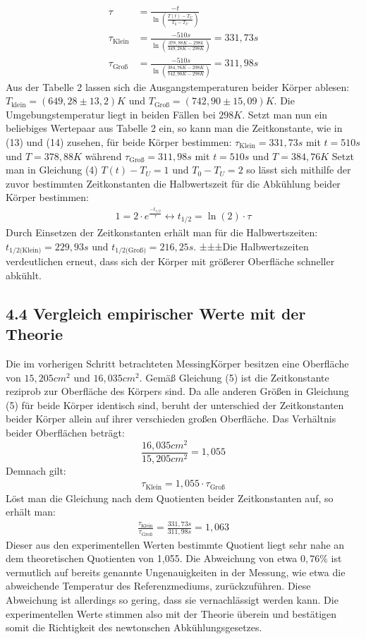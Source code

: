 \documentclass[a4paper]{article}
\begin{document}
\begin{align}
\tau&=\frac{-t}{\ln\left(\frac{T(t)-T_U}{T_0-T_U}\right)}\\
\tau_{\text{Klein}}&=\frac{-510s}{\ln\left(\frac{378,88K-298k}{349,28K-298K}\right)}=331,73s\\
\tau_{\text{Groß}}&=\frac{-510s}{\ln\left(\frac{384,76K-298K}{742,90K-298K}\right)}=311,98s
\end{align}
 Aus der Tabelle 2 lassen sich die Ausgangstemperaturen beider Körper ablesen: $T_{\text{klein}}=(649,28\pm 13,2)K$ und $T_{\text{Groß}}=(742,90\pm 15,09)K$. Die Umgebungstemperatur liegt in beiden Fällen bei $298K$. Setzt man nun ein beliebiges Wertepaar aus Tabelle 2 ein, so kann man die Zeitkonstante, wie in (13) und (14) zusehen, für beide Körper bestimmen: $\tau_{\text{Klein}}=331,73s$ mit $t=510s$ und $T=378,88K$ während $\tau_{\text{Groß}}=311,98s$ mit $t=510s$ und $T=384,76K$ Setzt man in Gleichung (4) $T(t)-T_U=1$ und $T_0-T_U=2$ so lässt sich mithilfe der zuvor bestimmten Zeitkonstanten die Halbwertszeit für die Abkühlung beider Körper bestimmen:
\begin{align}
1=2\cdot e^{\frac{-t_{1/2}}{\tau}}\leftrightarrow t_{1/2}=\ln(2)\cdot\tau
\end{align}
Durch Einsetzen der Zeitkonstanten erhält man für die Halbwertszeiten: $t_{1/2\text{(Klein)}}=229,93s$ und $t_{1/2\text{(Groß)}}=216,25s$. ±±±Die Halbwertszeiten verdeutlichen erneut, dass sich der Körper mit größerer Oberfläche schneller abkühlt.
\subsection*{4.4 Vergleich empirischer Werte mit der Theorie}
Die im vorherigen Schritt betrachteten MessingKörper  besitzen eine Oberfläche von $15,205cm^2$ und $16,035cm^2$. Gemäß Gleichung (5) ist die Zeitkonstante reziprob zur Oberfläche des Körpers sind. Da alle anderen Größen in Gleichung (5) für beide Körper identisch sind, beruht der unterschied der Zeitkonstanten beider Körper allein auf ihrer verschieden großen Oberfläche. Das Verhältnis beider Oberflächen beträgt: $$\frac{16,035cm^2}{15,205cm^2}=1,055$$ Demnach gilt:
\begin{align}
\tau_{\text{Klein}}=1,055\cdot\tau_{\text{Groß}}
\end{align}
Löst man die Gleichung nach dem Quotienten beider Zeitkonstanten auf, so erhält man:
\begin{align}
\frac{\tau_{\text{Klein}}}{\tau_{\text{Groß}}}=\frac{331,73s}{311,98s}=1,063
\end{align}
Dieser aus den experimentellen Werten bestimmte Quotient liegt sehr nahe an dem theoretischen Quotienten von 1,055. Die Abweichung von etwa $0,76\%$ ist vermutlich auf bereits genannte Ungenauigkeiten in der Messung, wie etwa die abweichende Temperatur des Referenzmediums, zurückzuführen. Diese Abweichung ist allerdings so gering, dass sie vernachlässigt werden kann. Die experimentellen Werte stimmen also mit der Theorie überein und bestätigen somit die Richtigkeit des newtonschen Abkühlungsgesetzes.
\end{document}
